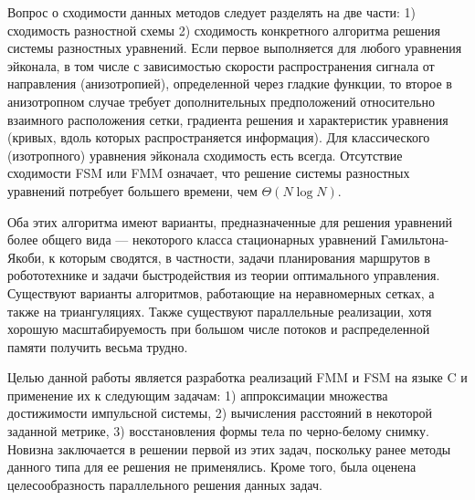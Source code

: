  Вопрос о сходимости данных методов следует разделять на две части: 1) сходимость разностной схемы 2) сходимость конкретного алгоритма решения системы разностных уравнений. 
 Если первое выполняется для любого уравнения эйконала, в том числе с зависимостью скорости распространения сигнала от направления (анизотропией), определенной через гладкие функции, 
 то второе в анизотропном случае требует дополнительных предположений относительно взаимного расположения сетки, градиента решения и характеристик уравнения (кривых, вдоль которых распространяется информация). Для классического (изотропного) уравнения эйконала сходимость есть всегда.
 Отсутствие сходимости FSM или FMM означает, что решение системы разностных уравнений потребует большего времени, чем $\Theta(N \log N)$.
 
Оба этих алгоритма имеют варианты, предназначенные для решения уравнений более общего вида --- некоторого класса стационарных уравнений Гамильтона-Якоби, 
к которым сводятся, в частности, задачи планирования маршрутов в робототехнике и задачи быстродействия из теории оптимального управления.
Существуют варианты алгоритмов, работающие на неравномерных сетках, а также на триангуляциях. Также существуют параллельные реализации, хотя хорошую масштабируемость 
при большом числе потоков и распределенной памяти получить весьма трудно.

Целью данной работы является разработка реализаций  FMM и FSM на языке C и применение их к следующим задачам: 1) аппроксимации множества достижимости импульсной системы, 
2) вычисления расстояний в некоторой заданной метрике, 3) восстановления формы тела по черно-белому снимку. Новизна заключается в решении первой из этих задач, поскольку ранее методы данного типа для ее решения не применялись. Кроме того, была оценена целесообразность параллельного решения данных задач.

